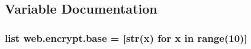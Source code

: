 \subsection{Variable Documentation}
\hypertarget{namespaceweb_1_1encrypt_a1d14d72c54edd236061a28d9dfe208ed}{
\subsubsection[{base}]{\setlength{\rightskip}{0pt plus 5cm}list web.\-encrypt.\-base = \mbox{[}str(x) for x in range(10)\mbox{]}}}\label{namespaceweb_1_1encrypt_a1d14d72c54edd236061a28d9dfe208ed}
